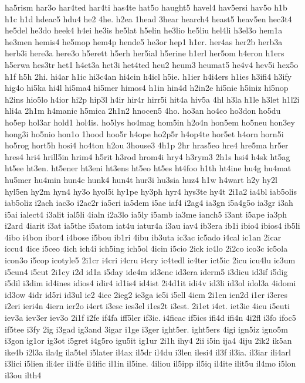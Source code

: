 {ha5rism
har3o
har4ted
har4ti
has4te
hat5o
haught5
havel4
hav5ersi
hav5o
h1b
h1c
h1d
hdeac5
hdu4
he2
4he.
h2ea
1head
3hear
hearch4
heast5
heav5en
hec3t4
he5del
he3do
heek4
h4ei
he3is
he5lat
h5elin
he3lio
he5liu
hel4li
h3el3o
hem1a
he3men
hemis4
he5mop
hem4p
hende5
he3or
hep1
h1er.
her4as
her2b
herb3a
herb3i
here3a
here3o
h5erett
h5erh
her5ial
h5erine
h1erl
her5om
h4eron
h1ers
h5erwa
hes3tr
het1
h4et3a
het3i
het4ted
heu2
heum3
heumat5
he4v4
hev5i
hex5o
h1f
h5h
2hi.
hi4ar
h1ic
hi3c4an
hi4cin
h4icl
h5ie.
h1ier
h4i4ers
h1ies
h3ifi4
h3ify
hig4o
hi5ka
hi4l
hi5ma4
hi5mer
himos4
h1in
hin4d
h2in2e
hi5nie
h5iniz
hi5nop
h2ins
hio5lo
h4ior
hi2p
hip3l
h4ir
hir4r
hirr5i
hit4a
hiv5a
4hl
h3la
h1le
h3let
h1l2i
hli4a
2h1m
h4manic
h5mica
2h1n2
hnocen5
4ho.
ho3an
ho4co
ho3don
ho5du
ho5ep
hol3ar
hold1
hol4is.
ho5lys
ho4mag
hom5in
h2o4n
hon5em
ho5neu
hon3ey
hong3i
ho5nio
hon1o
1hood
hoo5r
h4ope
ho2p5r
h4op4te
hor5et
h4orn
horn5i
ho5rog
hort5h
hosi4
ho4ton
h2ou
3house3
4h1p
2hr
hras5eo
hre4
hre5ma
hr5er
hres4
hri4
hrill5in
hrim4
h5rit
h3rod
hrom4i
hry4
h3rym3
2h1s
hsi4
h4sk
ht5ag
ht5ee
ht3en.
ht5ener
ht3eni
ht3ens
ht5eo
ht5es
ht4foo
h1th
ht4ine
hu4g
hu4mat
hu5mer
hu4min
hun4c
hunk4
hun4t
hur3i
hu3sia
huz4
h1w
h4wart
h2y
hy2l
hyl5en
hy2m
hyn4
hy3o
hyol5i
hy1pe
hy3ph
hyr4
hys3te
hy4t
2i1a2
ia4bl
iab5olis
iab5oliz
i2ach
iac3o
i2ac2r
ia5cri
ia5dem
i5ae
iaf4
i2ag4
ia3gn
i5a4g5o
ia3gr
i3ah
i5ai
ialect4
i3alit
ial5li
4ialn
i2a3lo
ia5ly
i5amb
ia3me
ianch5
i3ant
i5ape
ia3ph
i2ard
4iarit
i3at
ia5the
i5atom
iat4u
iatur4a
i3au
iav4
ib3era
ib1i
ibio4
ibios4
ib5li
4ibo
i4bon
ibor4
i4bose
i5bou
ib1ri
4ibu
ib3uta
ic3ac
ic5ado
i4cal
ic1an
2icar
iccu4
4ice
i5ceo
4ich
ich4i
ich5ing
ich5ol
4icin
i5cio
2ick
ic4lo
2i2co
ico3c
ic5ola
icon3o
i5cop
icotyle5
2i1cr
i4cri
i4cru
i4cry
ic4tedl
ic4ter
ict5ic
2icu
icu4lu
ic3um
i5cun4
i5cut
2i1cy
i2d
id1a
i5day
ide4m
id3enc
id3era
iderm5
i3dicu
id3if
i5dig
i5dil
i3dim
id4ines
idios4
idir4
id1is4
id4ist
2i4d1it
idi4v
id3li
id3ol
idol3a
4idomi
id3ow
4idr
id5ri
id3ul
ie2
4iec
2ieg2
ie3ga
ie5i
i5ell
4iem
2i1en
ien2d
i1er
i3eres
i2eri
ieri4n
4iern
ier2o
i4ert
i3esc
ies3el
i1es2t
i3est.
2i1et
i4et.
iet3ie
4ieu
i5euti
iev3a
iev3er
iev3o
2i1f
i2fe
if4fa
iff5ler
if3ic.
i4ficac
if5ics
ifi4d
ifi4n
4i2fl
i3fo
ifoc5
if5tee
i3fy
2ig
i3gad
ig3and
3igar
i1ge
i3ger
ight5er.
ight5ers
4igi
ign5iz
igno5m
i3gon
ig1or
ig3ot
i5gret
i4g5ro
igu5it
ig1ur
2i1h
ihy4
2ii
i5in
ija4
4iju
2ik2
ik5an
ike4b
i2l3a
ila4g
ila5tel
i5later
il4ax
il5dr
il4du
i3len
ilesi4
il3f
il3ia.
il3iar
ili4arl
i3lici
i5lien
ili4er
ili4fe
il4ific
il1in
il5ine.
4iliou
il5ipp
il5iq
il4ite
ilit5u
il4mo
i5lon
il3ou
ilth4
}
